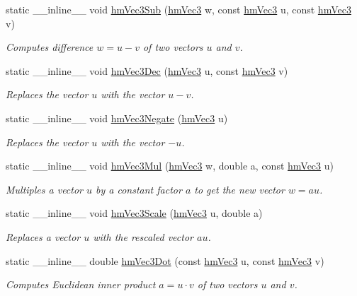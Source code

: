 \begin{DoxyCompactItemize}
static \-\_\-\-\_\-inline\-\_\-\-\_\- void \hyperlink{classhm_vec3_a58177b02f8f049a3124775f8823dfc43}{hm\-Vec3\-Sub} (\hyperlink{classhm_vec3}{hm\-Vec3} w, const \hyperlink{classhm_vec3}{hm\-Vec3} u, const \hyperlink{classhm_vec3}{hm\-Vec3} v)
\begin{DoxyCompactList}\small\item\em Computes difference $w=u-v$ of two vectors $u$ and $v$. \end{DoxyCompactList}\item 
static \-\_\-\-\_\-inline\-\_\-\-\_\- void \hyperlink{classhm_vec3_abe0c701cc9e659ff4c1a3d4c7f1ea74d}{hm\-Vec3\-Dec} (\hyperlink{classhm_vec3}{hm\-Vec3} u, const \hyperlink{classhm_vec3}{hm\-Vec3} v)
\begin{DoxyCompactList}\small\item\em Replaces the vector $u$ with the vector $u-v$. \end{DoxyCompactList}\item 
static \-\_\-\-\_\-inline\-\_\-\-\_\- void \hyperlink{classhm_vec3_a97ed7299caacf34be0e6e45a6448978e}{hm\-Vec3\-Negate} (\hyperlink{classhm_vec3}{hm\-Vec3} u)
\begin{DoxyCompactList}\small\item\em Replaces the vector $u$ with the vector $-u$. \end{DoxyCompactList}\item 
static \-\_\-\-\_\-inline\-\_\-\-\_\- void \hyperlink{classhm_vec3_a58bb1f57f250511da6d5957ec9fbe6fd}{hm\-Vec3\-Mul} (\hyperlink{classhm_vec3}{hm\-Vec3} w, double a, const \hyperlink{classhm_vec3}{hm\-Vec3} u)
\begin{DoxyCompactList}\small\item\em Multiples a vector $u$ by a constant factor $a$ to get the new vector $w=au$. \end{DoxyCompactList}\item 
static \-\_\-\-\_\-inline\-\_\-\-\_\- void \hyperlink{classhm_vec3_a73cbf744c1e5c75e216cfe28d6cbe92a}{hm\-Vec3\-Scale} (\hyperlink{classhm_vec3}{hm\-Vec3} u, double a)
\begin{DoxyCompactList}\small\item\em Replaces a vector $u$ with the rescaled vector $au$. \end{DoxyCompactList}\item 
static \-\_\-\-\_\-inline\-\_\-\-\_\- double \hyperlink{classhm_vec3_ab380b4d6e2dfd94a0f8ea49675597756}{hm\-Vec3\-Dot} (const \hyperlink{classhm_vec3}{hm\-Vec3} u, const \hyperlink{classhm_vec3}{hm\-Vec3} v)
\begin{DoxyCompactList}\small\item\em Computes Euclidean inner product $a = u \cdot v $ of two vectors $u$ and $v$. \end{DoxyCompactList}\item 

\end{DoxyCompactItemize}
